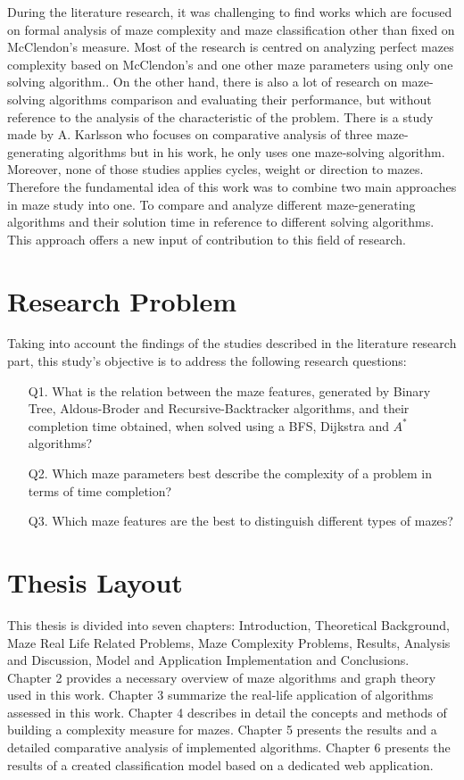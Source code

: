 During the literature research, it was challenging to find works which are focused on formal analysis of maze complexity and maze classification other than fixed on 
McClendon's measure. Most of the research is centred on analyzing perfect mazes complexity based on McClendon's and one other maze parameters using only one solving algorithm.\cite{Kwiecien}\cite{Bellot}.
On the other hand, there is also a lot of research on maze-solving algorithms comparison and evaluating their performance, but without reference to the analysis of the 
characteristic of the problem\cite{Liu}. There is a study made by A. Karlsson \cite{Karlsson} who focuses on comparative analysis of three maze-generating algorithms
but in his work, he only uses one maze-solving algorithm. Moreover, none of those studies applies cycles, weight or direction to mazes. Therefore the fundamental idea of this work was to combine two main approaches in maze study into one. To compare and analyze different 
maze-generating algorithms and their solution time in reference to different solving algorithms. This approach offers a new input of contribution to this field of research.

\section{Research Problem}
Taking into account the findings of the studies described in the literature research part, this study's objective is to address the following research questions:\\
\begin{enumerate}
    \item [Q1.] What is the relation between the maze features, generated by Binary Tree, Aldous-Broder and Recursive-Backtracker algorithms,
     and their completion time obtained, when solved using a BFS, Dijkstra and $A^*$ algorithms?
    \item [Q2.] Which maze parameters best describe the complexity of a problem in terms of time completion?
    \item [Q3.] Which maze features are the best to distinguish different types of mazes?
\end{enumerate}
\section{Thesis Layout}
This thesis is divided into seven chapters: Introduction, Theoretical Background, Maze Real Life Related Problems, 
Maze Complexity Problems, Results, Analysis and Discussion, Model and Application Implementation and Conclusions.
Chapter 2 provides a necessary overview of maze algorithms and graph theory used in this work. Chapter 3 summarize the real-life application of algorithms 
assessed in this work. Chapter 4 describes in detail the concepts and methods of building a complexity measure for mazes. Chapter 5 presents the 
results and a detailed comparative analysis of implemented algorithms. Chapter 6 presents the results of a created classification model based on a dedicated web application.
